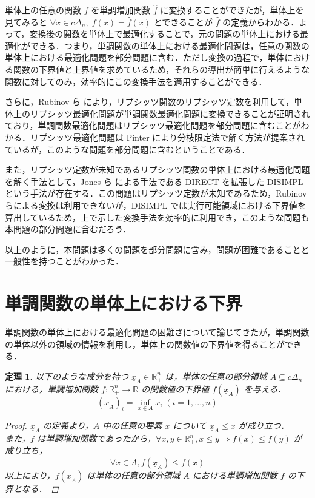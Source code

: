 \documentclass[a4paper,11pt]{jreport}
\newtheorem{theorem}{定理}
\begin{document}
単体上の任意の関数 $ f $ を単調増加関数 $ \hat{f} $ に変換することができたが，単体上を見てみると $ \forall x \in c \Delta_n, \; f(x) = \hat{f}(x) $ とできることが $ \hat{f} $ の定義からわかる．よって，変換後の関数を単体上で最適化することで，元の問題の単体上における最適化ができる．つまり，単調関数の単体上における最適化問題は，任意の関数の単体上における最適化問題を部分問題に含む．ただし変換の過程で，単体における関数の下界値と上界値を求めているため，それらの導出が簡単に行えるような関数に対してのみ，効率的にこの変換手法を適用することができる．\par
さらに，Rubinov ら \cite{rubinov} により，リプシッツ関数のリプシッツ定数を利用して，単体上のリプシッツ最適化問題が単調関数最適化問題に変換できることが証明されており，単調関数最適化問題はリプシッツ最適化問題を部分問題に含むことがわかる．リプシッツ最適化問題は Pinter \cite{pinter} により分枝限定法で解く方法が提案されているが，このような問題を部分問題に含むということである．\par
また，リプシッツ定数が未知であるリプシッツ関数の単体上における最適化問題を解く手法として，Jones ら \cite{direct} による手法である DIRECT を拡張した DISIMPL \cite{disimpl} という手法が存在する．この問題はリプシッツ定数が未知であるため，Rubinov らによる変換は利用できないが，DISIMPL では実行可能領域における下界値を算出しているため，上で示した変換手法を効率的に利用でき，このような問題も本問題の部分問題に含むだろう．\par
以上のように，本問題は多くの問題を部分問題に含み，問題が困難であることと一般性を持つことがわかった．

\section{単調関数の単体上における下界} \label{sec:lower_bound_of_monotonic_function_on_simplex}

単調関数の単体上における最適化問題の困難さについて論じてきたが，単調関数の単体以外の領域の情報を利用し，単体上の関数値の下界値を得ることができる．

\begin{theorem}\label{thm:lower_bound_of_monotonic_function}
以下のような成分を持つ $ \underline{x}_A \in \mathbb{R}^n_{+} $ は，単体の任意の部分領域 $ A \subseteq c \Delta_n $ における，単調増加関数 $ f :  \mathbb{R}^n_{+} \to \mathbb{R} $ の関数値の下界値 $ f(\underline{x}_A) $ を与える．
$$ (\underline{x}_A)_i = \inf_{x \in A } x_i \; (i = 1, ..., n) $$

\begin{proof}
$ \underline{x}_A $ の定義より，$ A $ 中の任意の要素 $ x $ について $ \underline{x}_A \leq x $ が成り立つ．\\
また，$ f $ は単調増加関数であったから，$ \forall x, y \in \mathbb{R}^n_{+}, x \leq y \Rightarrow f(x) \leq f(y) $ が成り立ち，
$$ \forall x \in A, f(\underline{x}_A) \leq f(x) $$
以上により，$ f(\underline{x}_A) $ は単体の任意の部分領域 $ A $ における単調増加関数 $ f $ の下界となる．
\end{proof}

\end{theorem}
\end{document}

